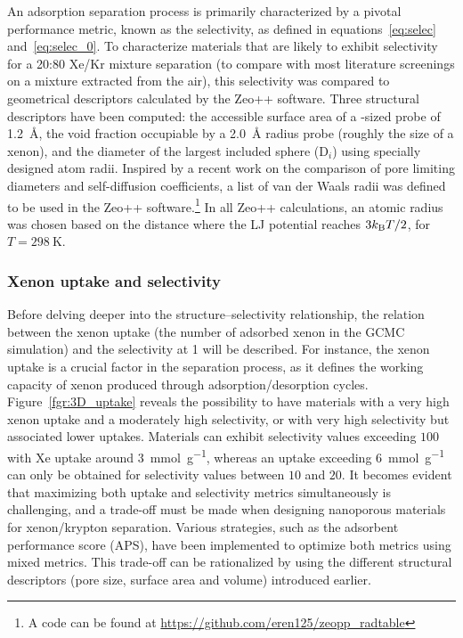 \documentclass[main.tex]{subfiles}
\begin{document}
An adsorption separation process is primarily characterized by a pivotal performance metric, known as the selectivity, as defined in equations~\ref{eq:selec} and~\ref{eq:selec_0}. To characterize materials that are likely to exhibit selectivity for a 20:80 Xe/Kr mixture separation (to compare with most literature screenings on a mixture extracted from the air), this selectivity was compared to geometrical descriptors calculated by the Zeo++ software\autocite{Zeo++}. Three structural descriptors have been computed: the accessible surface area of a -sized probe of \SI{1.2}{\angstrom}, the void fraction occupiable by a \SI{2.0}{\angstrom} radius probe (roughly the size of a xenon),\autocite{vol_Ongari2017} and the diameter of the largest included sphere (D$_i$) using specially designed atom radii. Inspired by a recent work on the comparison of pore limiting diameters and self-diffusion coefficients,\autocite{Hung_2021} a list of van der Waals radii was defined to be used in the Zeo++ software.\footnote[1]{A code can be found at \url{https://github.com/eren125/zeopp_radtable}} In all Zeo++ calculations, an atomic radius was chosen based on the distance where the LJ potential reaches $3 k_{\text{B}} T/2$, for $T = \SI{298}{\kelvin}$.

\subsubsection{Xenon uptake and selectivity}

Before delving deeper into the structure--selectivity relationship, the relation between the xenon uptake (the number of adsorbed xenon in the GCMC simulation) and the selectivity at \SI{1}{\atm} will be described. For instance, the xenon uptake is a crucial factor in the separation process, as it defines the working capacity of xenon produced through adsorption/desorption cycles. Figure~\ref{fgr:3D_uptake} reveals the possibility to have materials with a very high xenon uptake and a moderately high selectivity, or with very high selectivity but associated lower uptakes. Materials can exhibit selectivity values exceeding $100$ with Xe uptake around \SI{3}{\milli\mole\per\gram}, whereas an uptake exceeding \SI{6}{\milli\mole\per\gram} can only be obtained for selectivity values between $10$ and $20$. It becomes evident that maximizing both uptake and selectivity metrics simultaneously is challenging, and a trade-off must be made when designing nanoporous materials for xenon/krypton separation.\autocite{Zhang_2022} Various strategies, such as the adsorbent performance score (APS),\autocite{Solanki_2020} have been implemented to optimize both metrics using mixed metrics.
This trade-off can be rationalized by using the different structural descriptors (pore size, surface area and volume) introduced earlier. 
\end{document}
